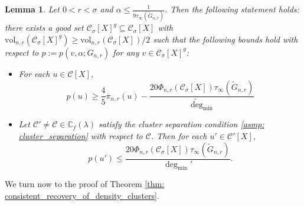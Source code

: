 \documentclass[11pt,twoside]{article}
\newtheorem{lemma}{Lemma}
\newcommand{\vol}{\mathrm{vol}}
\newcommand{\1}{\mathbf{1}}
\newcommand{\pbf}{p}        %
\newcommand{\pibf}{\pi}
\newcommand{\Xbf}{X}             %
\newcommand{\Cbb}{\mathbb{C}}
\newcommand{\Cset}{\mathcal{C}}
\newcommand{\Csig}{\Cset_{\sigma}}
\newcommand{\degminpr}{\deg_{\min}'}
\newcommand{\degminwt}{\widetilde{\deg}_{\min}}
\begin{document}
\begin{lemma} 
	\label{lem: setup}
	Let $0 < r < \sigma$ and $\alpha \leq \frac{1}{9 \tau_{\infty}(\widetilde{G}_{n,r})}$. Then the following statement holds: there exists a good set $\Csig[\Xbf]^g \subseteq \Csig[\Xbf]$ with $\vol_{n,r}(\Csig[\Xbf]^g) \geq \vol_{n,r}(\Csig[\Xbf])/2$ such that the following bounds hold with respect to $\pbf := \pbf(v,\alpha;G_{n,r})$ for any $v \in \Csig[\Xbf]^g$:
	\begin{itemize}
		\item For each $u \in \Cset[\Xbf]$,
		\begin{equation}
		\label{eqn: lower_bound_PPR_in_cluster}
		\pbf(u) \geq \frac{4}{5} \overline{\pibf}_{n,r}(u) - \frac{20 \Phi_{n,r}(\Csig[\Xbf]) \tau_{\infty}(\widetilde{G}_{n,r})}{\degminwt}
		\end{equation}
		\item Let $\Cset' \neq \Cset \in \Cbb_f(\lambda)$ satisfy the cluster separation condition \ref{asmp: cluster_separation} with respect to $\Cset$. Then for each $u' \in \Cset'[\Xbf]$,
		\begin{equation}
		\label{eqn: upper_bound_PPR_in_other_cluster}
		\pbf(u') \leq \frac{20 \Phi_{n,r}(\Csig[\Xbf]) \tau_{\infty}(\widetilde{G}_{n,r})}{\degminpr}.
		\end{equation}
	\end{itemize}
\end{lemma}

We turn now to the proof of Theorem \ref{thm: consistent_recovery_of_density_clusters}.

\end{document}
